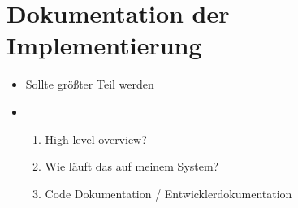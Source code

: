 \section{Dokumentation der Implementierung}
\begin{itemize}
	\item Sollte größter Teil werden
	\item \begin{enumerate}
		      \item High level overview?
		      \item Wie läuft das auf meinem System?
		      \item Code Dokumentation / Entwicklerdokumentation
	      \end{enumerate}
\end{itemize}





